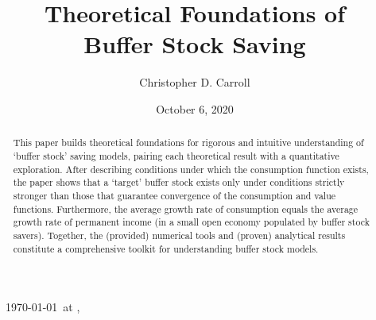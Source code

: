 \documentclass[BufferStockTheory]{subfiles}
\begin{document}
\providecommand{\versn}{} %
\ifthenelse{\boolean{ifWeb}}{  \renewcommand{\ushort}{\underline}\renewcommand{\versn}{Web} }{} %

\hfill{\tiny \jobname~\versn~\today~{at} \DTMcurrenttime, ~~}

\title{Theoretical Foundations of \\ Buffer Stock Saving}

\author{Christopher D. Carroll\authNum}



\renewcommand{\forcedate}{October 6, 2020}
\date{\forcedate}

\maketitle %
\hypertarget{abstract}{}
\begin{abstract}
  This paper builds theoretical foundations for rigorous and intuitive understanding of `buffer stock' saving models, pairing each theoretical result with a quantitative exploration.  After describing conditions under which the consumption function exists, the paper shows that a `target' buffer stock exists only under conditions strictly stronger than those that guarantee convergence of the consumption and value functions.  Furthermore, the average growth rate of consumption equals the average growth rate of permanent income (in a small open economy populated by buffer stock savers).  Together, the (provided) numerical tools and (proven) analytical results constitute a comprehensive toolkit for understanding buffer stock models.
\end{abstract}
\end{document}
